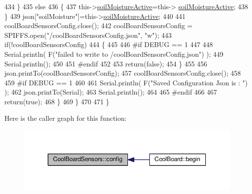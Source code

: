 \begin{DoxyCode}
434             \}
435             \textcolor{keywordflow}{else}
436             \{
437                 this->\hyperlink{classCoolBoardSensors_a31983eecc0f9cd000e1f912206ea4dc8}{soilMoistureActive}=this->
      \hyperlink{classCoolBoardSensors_a31983eecc0f9cd000e1f912206ea4dc8}{soilMoistureActive};
438             \}
439             json[\textcolor{stringliteral}{"soilMoisture"}]=this->\hyperlink{classCoolBoardSensors_a31983eecc0f9cd000e1f912206ea4dc8}{soilMoistureActive};
440 
441             coolBoardSensorsConfig.close();         
442             coolBoardSensorsConfig = SPIFFS.open(\textcolor{stringliteral}{"/coolBoardSensorsConfig.json"}, \textcolor{stringliteral}{"w"});          
443             \textcolor{keywordflow}{if}(!coolBoardSensorsConfig)
444             \{
445             
446 \textcolor{preprocessor}{            #if DEBUG == 1}
447 
448                 Serial.println( F(\textcolor{stringliteral}{"failed to write to /coolBoardSensorsConfig.json"}) );
449                 Serial.println();
450             
451 \textcolor{preprocessor}{            #endif}
452 
453                 \textcolor{keywordflow}{return}(\textcolor{keyword}{false});          
454             \}  
455 
456             json.printTo(coolBoardSensorsConfig);
457             coolBoardSensorsConfig.close();         
458             
459 \textcolor{preprocessor}{        #if DEBUG == 1}
460 
461             Serial.println( F(\textcolor{stringliteral}{"Saved Configuration Json is : "}) );
462             json.printTo(Serial);
463             Serial.println();
464         
465 \textcolor{preprocessor}{        #endif}
466 
467             \textcolor{keywordflow}{return}(\textcolor{keyword}{true}); 
468         \}
469     \}   
470 
471 \}
\end{DoxyCode}
Here is the caller graph for this function\+:\nopagebreak
\begin{figure}[H]
\begin{center}
\leavevmode
\includegraphics[width=339pt]{classCoolBoardSensors_a9a218895c5423375c33c08f2c56fb23a_icgraph}
\end{center}
\end{figure}
\mbox{\label{classCoolBoardSensors_a4902b69f6e628bd6557193758fdd2bae}} 
